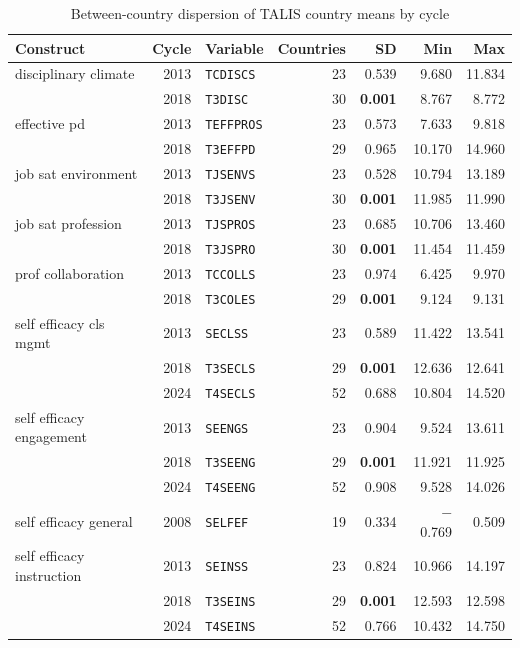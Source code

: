 \begin{table}[htbp]
\centering
\scriptsize
\caption{Between-country dispersion of TALIS country means by cycle}
\label{tab:D1}
\begin{tabular}{lrlrrrr}
\toprule
Construct & Cycle & Variable & Countries & SD & Min & Max \\
\midrule
disciplinary climate & 2013 & \texttt{TCDISCS} & 23 & 0.539 & 9.680 & 11.834 \\
 & 2018 & \texttt{T3DISC} & 30 & \textbf{0.001} & 8.767 & 8.772 \\
effective pd & 2013 & \texttt{TEFFPROS} & 23 & 0.573 & 7.633 & 9.818 \\
 & 2018 & \texttt{T3EFFPD} & 29 & 0.965 & 10.170 & 14.960 \\
job sat environment & 2013 & \texttt{TJSENVS} & 23 & 0.528 & 10.794 & 13.189 \\
 & 2018 & \texttt{T3JSENV} & 30 & \textbf{0.001} & 11.985 & 11.990 \\
job sat profession & 2013 & \texttt{TJSPROS} & 23 & 0.685 & 10.706 & 13.460 \\
 & 2018 & \texttt{T3JSPRO} & 30 & \textbf{0.001} & 11.454 & 11.459 \\
prof collaboration & 2013 & \texttt{TCCOLLS} & 23 & 0.974 & 6.425 & 9.970 \\
 & 2018 & \texttt{T3COLES} & 29 & \textbf{0.001} & 9.124 & 9.131 \\
self efficacy cls mgmt & 2013 & \texttt{SECLSS} & 23 & 0.589 & 11.422 & 13.541 \\
 & 2018 & \texttt{T3SECLS} & 29 & \textbf{0.001} & 12.636 & 12.641 \\
 & 2024 & \texttt{T4SECLS} & 52 & 0.688 & 10.804 & 14.520 \\
self efficacy engagement & 2013 & \texttt{SEENGS} & 23 & 0.904 & 9.524 & 13.611 \\
 & 2018 & \texttt{T3SEENG} & 29 & \textbf{0.001} & 11.921 & 11.925 \\
 & 2024 & \texttt{T4SEENG} & 52 & 0.908 & 9.528 & 14.026 \\
self efficacy general & 2008 & \texttt{SELFEF} & 19 & 0.334 & $-$0.769 & 0.509 \\
self efficacy instruction & 2013 & \texttt{SEINSS} & 23 & 0.824 & 10.966 & 14.197 \\
 & 2018 & \texttt{T3SEINS} & 29 & \textbf{0.001} & 12.593 & 12.598 \\
 & 2024 & \texttt{T4SEINS} & 52 & 0.766 & 10.432 & 14.750 \\
\bottomrule
\end{tabular}
\par{}
\end{table}
